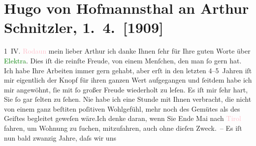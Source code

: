 

               \section[Hugo von Hofmannsthal an Arthur Schnitzler, 1. 4. {[}1909{]}]{ Hugo von Hofmannsthal an Arthur Schnitzler, 1. 4. {[}1909{]}}\nopagebreak{}\rehead{ }\normalsize\beginnumbering{} \toendnotes[C]{\smallbreak\pagebreak[2]} 
\toendnotes[C]{\smallbreak}\pstart
           \raggedleft{}{\pb}1 IV.{ }\textcolor{pink}{Rodaun}{}\ledrightnote{\textcolor{pink}{Rodaun}}\pend
           \pstart{}mein lieber Arthur\pend\pstart
           ich danke Ihnen ſehr für Ihre guten Worte über \textcolor{green}{Elektra}{}\ledrightnote{\textcolor{green}{Elektra. Tragödie in einem Aufzug}}. Dies iſt die reinſte Freude, von einem Menſchen, den man ſo gern
               hat. Ich habe Ihre Arbeiten immer gern gehabt, aber erſt in den letzten 4–5 Jahren
               iſt mir eigentlich der Knopf für ihren ganzen Wert aufgegangen {\pb}und ſeitdem habe ich mir
               angewöhnt, ſie mit ſo großer Freude wiederholt zu leſen.\pend
           \pstart
           Es iſt mir ſehr hart, Sie ſo gar ſelten zu ſehen. Nie habe ich eine Stunde mit Ihnen
               verbracht, die nicht von einem ganz beſti{\geminationm}ten poſitiven
               Wohlgefühl, mehr noch des Gemütes als des Geiſtes begleitet geweſen wäre.\hspace*{1.5em}Ich denke daran, {\pb}wenn Sie Ende Mai
               nach \textcolor{pink}{Tirol}{}\ledrightnote{\textcolor{pink}{Tirol}} fahren, um Wohnung zu ſuchen,
               mitzufahren, auch ohne dieſen Zweck. – Es iſt nun bald zwanzig Jahre, daſs wir uns
